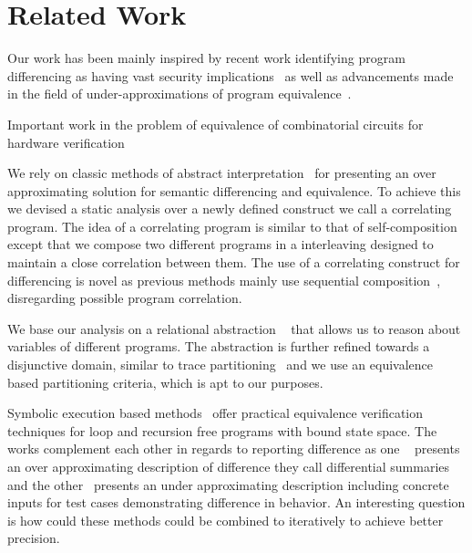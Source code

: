 \section{Related Work} 

Our work has been mainly inspired by recent work identifying program differencing as having vast security implications~\cite{BrumleyPoosankamSongZheng08,SongSunZhang09} as well as advancements made in the field of under-approximations of program equivalence~\cite{GodlinStrichman09, KawaguchiLahiriRebelo10, DwyerElbaumPerson08, EnglerRamos11}.

Important work in the problem of equivalence of combinatorial circuits for hardware verification~\cite{KuehlmannKrohm97,BraytonChatterjeeMishchenkoEen06, ClarkeKroening03} 

We rely on classic methods of abstract interpretation~\cite{CousotCousot77} for presenting an over approximating solution for semantic differencing and equivalence. To achieve this we devised a static analysis over a newly defined construct we call a correlating program. The idea of a correlating program is similar to that of
self-composition~\cite{BartheDArgenioRezk04, AikenTerauchi05} except that we compose two different programs in a interleaving designed to maintain a close correlation between them. The use of a correlating construct for differencing is novel as previous methods mainly use sequential composition~\cite{GodlinStrichman09, KawaguchiLahiriRebelo10, DwyerElbaumPerson08, EnglerRamos11}, disregarding possible program correlation.

We base our analysis on a relational abstraction ~\cite{CousotHalbwachs78, Mine07} that allows us to reason about variables of different programs. The abstraction is further refined towards a disjunctive domain, similar to trace partitioning~\cite{MauborgneRival07} and we use an equivalence based partitioning criteria, which is apt to our purposes.

Symbolic execution based methods~\cite{DwyerElbaumPerson08, EnglerRamos11} offer practical equivalence verification techniques for loop and recursion free programs with bound state space. The works complement each other in regards to reporting difference as one ~\cite{DwyerElbaumPerson08} presents an over approximating description of difference they call differential summaries and the other~\cite{EnglerRamos11} presents an under approximating description including concrete inputs for test cases demonstrating difference in behavior. An interesting question is how could these methods could be combined to iteratively to achieve better precision.

